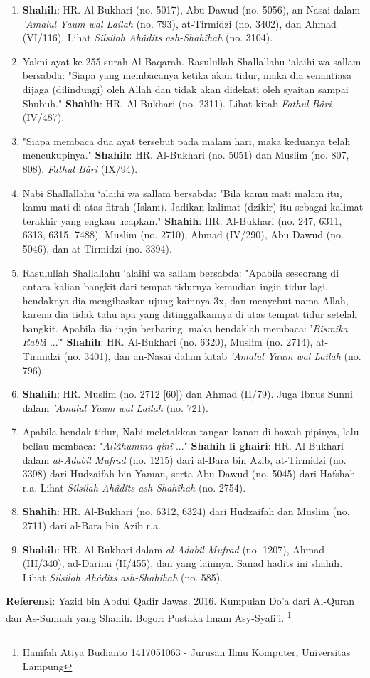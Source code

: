 \documentclass[a4paper,12pt]{article}
\begin{document}
\begin{enumerate}
\item \textbf{Shahih}: HR. Al-Bukhari (no. 5017), Abu Dawud (no. 5056), 
an-Nasai dalam \textit{'Amalul Yaum wal Lailah} (no. 793), at-Tirmidzi 
(no. 3402), dan Ahmad (VI/116). Lihat \textit{Silsilah Ah\^{a}d\^{i}ts 
ash-Shah\^{i}hah} (no. 3104).
\item Yakni ayat ke-255 surah Al-Baqarah. Rasulullah Shallallahu ‘alaihi wa 
sallam bersabda: "Siapa yang membacanya ketika akan tidur, maka dia 
senantiasa dijaga (dilindungi) oleh Allah dan tidak akan didekati oleh 
syaitan sampai Shubuh." \textbf{Shahih}: HR. Al-Bukhari (no. 2311). Lihat 
kitab \textit{Fathul B\^{a}ri} (IV/487).
\item "Siapa membaca dua ayat tersebut pada malam hari, maka keduanya telah 
mencukupinya." \textbf{Shahih}: HR. Al-Bukhari (no. 5051) dan Muslim (no. 
807, 808). \textit{Fathul B\^{a}ri} (IX/94).
\item Nabi Shallallahu ‘alaihi wa sallam bersabda: "Bila kamu mati malam 
itu, kamu mati di atas fitrah (Islam). Jadikan kalimat (dzikir) itu sebagai 
kalimat terakhir yang engkau ucapkan." \textbf{Shahih}: HR. Al-Bukhari (no. 
247, 6311, 6313, 6315, 7488), Muslim (no. 2710), Ahmad (IV/290), Abu Dawud 
(no. 5046), dan at-Tirmidzi (no. 3394). 
\item Rasulullah Shallallahu ‘alaihi wa sallam bersabda: "Apabila seseorang 
di antara kalian bangkit dari tempat tidurnya kemudian ingin tidur lagi, 
hendaknya dia mengibaskan ujung kainnya 3x, dan menyebut nama Allah, karena 
dia tidak tahu apa yang ditinggalkannya di atas tempat tidur setelah 
bangkit. Apabila dia ingin berbaring, maka hendaklah membaca: 
'\textit{Bismika Rabb}i ...'"  \textbf{Shahih}: HR. Al-Bukhari (no. 6320), 
Muslim (no. 2714), at-Tirmidzi (no. 3401), dan an-Nasai dalam kitab 
\textit{'Amalul Yaum wal Lailah} (no. 796). 
\item \textbf{Shahih}: HR. Muslim (no. 2712 [60]) dan Ahmad (II/79). Juga 
Ibnus Sunni dalam \textit{'Amalul Yaum wal Lailah} (no. 721). 
\item Apabila hendak tidur, Nabi meletakkan tangan kanan di bawah pipinya, 
lalu beliau membaca: "\textit{All\^{a}humma qin\^{i}} ..." \textbf{Shahih 
li ghairi}: HR. Al-Bukhari dalam \textit{al-Adabil Mufrad} (no. 1215) dari 
al-Bara bin Azib, at-Tirmidzi (no. 3398) dari Hudzaifah bin Yaman, serta 
Abu Dawud (no. 5045) dari Hafshah r.a. Lihat \textit{Silsilah 
Ah\^{a}d\^{i}ts ash-Shah\^{i}hah} (no. 2754).
\item \textbf{Shahih}: HR. Al-Bukhari (no. 6312, 6324) dari Hudzaifah dan 
Muslim (no. 2711) dari al-Bara bin Azib r.a.
\item \textbf{Shahih}: HR. Al-Bukhari-dalam \textit{al-Adabil Mufrad} (no. 
1207), Ahmad (III/340), ad-Darimi (II/455), dan yang lainnya. Sanad hadits 
ini shahih. Lihat \textit{Silsilah Ah\^{a}d\^{i}ts ash-Shah\^{i}hah} (no. 
585).
\end{enumerate}
\textbf{Referensi}: Yazid bin Abdul Qadir Jawas. 2016. Kumpulan Do'a dari
Al-Quran dan As-Sunnah yang Shahih. Bogor: Pustaka Imam Asy-Syafi'i.
\footnote{Hanifah Atiya Budianto 1417051063 - Jurusan Ilmu Komputer,
Universitas Lampung}
\end{document}
